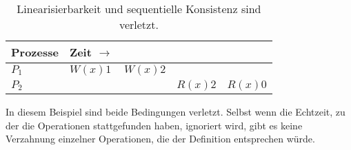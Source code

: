 \begin{table}
	\centering
	\begin{tabular}{l | l l l l}
		\textbf{Prozesse} & \textbf{Zeit} $\rightarrow$ \\
		\hline
		$P_{1}$ & $W(x)1$ & $W(x)2$ \\
		$P_{2}$ & & & \color{red} $R(x)2$ &  \color{red} $R(x)0$ \\
			
	\end{tabular}
	\caption{Linearisierbarkeit und sequentielle Konsistenz sind verletzt.}
	\label{tab:3}
\end{table}

In diesem Beispiel sind beide Bedingungen verletzt. Selbst wenn die Echtzeit, zu der die Operationen stattgefunden haben, ignoriert wird, gibt es keine Verzahnung einzelner Operationen, die der Definition entsprechen würde.
